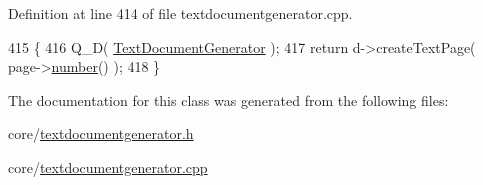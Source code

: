 Definition at line 414 of file textdocumentgenerator.\+cpp.


\begin{DoxyCode}
415 \{
416     Q\_D( \hyperlink{classOkular_1_1TextDocumentGenerator}{TextDocumentGenerator} );
417     \textcolor{keywordflow}{return} d->createTextPage( page->\hyperlink{classOkular_1_1Page_a6eee5f157a130b47d81ddd63e501664b}{number}() );
418 \}
\end{DoxyCode}


The documentation for this class was generated from the following files\+:\begin{DoxyCompactItemize}
\item 
core/\hyperlink{textdocumentgenerator_8h}{textdocumentgenerator.\+h}\item 
core/\hyperlink{textdocumentgenerator_8cpp}{textdocumentgenerator.\+cpp}\end{DoxyCompactItemize}
